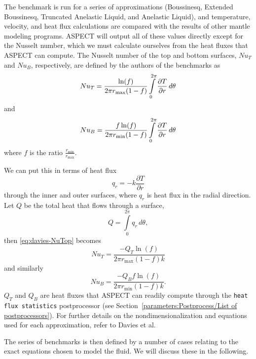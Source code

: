 \documentclass{article}
\newcommand{\aspect}{\textsc{ASPECT}}
\begin{document}
The benchmark is run for a series of approximations (Boussinesq, Extended Boussinesq,
Truncated Anelastic Liquid, and Anelastic Liquid), and temperature, velocity, and heat flux 
calculations are compared with the results of other mantle modeling programs. \aspect{}
will output all of these values directly except for the Nusselt number, which
we must calculate ourselves from the heat fluxes that \aspect{} can compute.
The Nusselt number of the top and bottom surfaces, ${Nu}_T$ and ${Nu}_B$,
respectively, are defined by the authors of the benchmarks as
\begin{equation}
\label{eq:davies-NuTop}
{Nu}_{T} = \frac{\ln(f)}{2{\pi}r_{\max}(1-f)}\int \limits_{0}^{2\pi} \frac{\partial T}{\partial r}\, d\theta  \\
\end{equation}
and
\begin{equation*}
\label{eq:davies-NuBottom}
{Nu}_{B} = \frac{f \ln(f)}{2{\pi}r_{\min}(1-f)}\int \limits_{0}^{2\pi} \frac{\partial T}{\partial r}\, d\theta \\
\end{equation*}
where $f$ is the ratio $\frac{r_{\min}}{r_{\max}}$.

We can put this in terms of heat flux
\begin{equation*}
  q_r = -k\frac{\partial T}{\partial r}
\end{equation*}
through the inner and outer surfaces,
where $q_r$ is heat flux in the radial direction. Let $Q$ be the total heat that flows through a surface,
\begin{equation*}
  Q = \int \limits_{0}^{2\pi} q_r\, d\theta,
\end{equation*}
then \eqref{eq:davies-NuTop} becomes
\begin{equation*}
  {Nu}_{T} = \frac{-Q_{T}\ln(f)}{2\pi{r_{\max}}(1-f)k}
\end{equation*}
and similarly
\begin{equation*}
  {Nu}_{B} = \frac{-Q_{B}f\ln(f)}{2\pi{r_{\min}}(1-f)k}.
\end{equation*} 
$Q_T$ and $Q_B$ are heat fluxes that \aspect{} can readily compute through the
\texttt{heat flux statistics} postprocessor (see
Section~\ref{parameters:Postprocess/List of postprocessors}).
For further details on the nondimensionalization and equations used for each
approximation, refer to Davies et al.

The series of benchmarks is then defined by a number of cases relating to the
exact equations chosen to model the fluid. We will discuss these in the
following.
\end{document}
